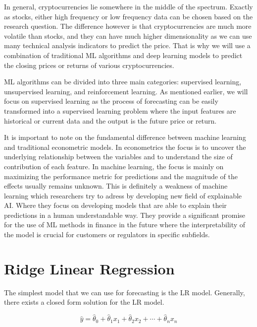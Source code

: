 In general, cryptocurrencies
lie somewhere in the middle of the spectrum. Exactly as stocks, either high frequency or low frequency
data can be chosen based on the research question. The difference however is that cryptocurrencies 
are much more volatile than stocks, and they can have much higher dimensionality as we can use 
many technical analysis indicators to predict the price. 
That is why we will use a combination of
traditional \ac{ML} algorithms and deep learning models to predict the 
closing prices or returns of
various cryptocurrencies.

\ac{ML} algorithms can be divided into three main categories: supervised learning, unsupervised learning, and reinforcement learning.
As mentioned earlier, we will focus on supervised learning as the process of forecasting
can be easily transformed into a supervised learning problem where the input features
are historical or current data and the output is the future price or return.


It is important to note on the fundamental difference between machine learning and
traditional econometric models. In econometrics the focus is to uncover the underlying
relationship between the variables and to understand the size of contribution of each
feature. In machine learning, the focus is mainly on maximizing the performance metric for predictions and 
the magnitude of the effects usually remains unknown. This is definitely a weakness of machine learning
which researchers try to adress by developing new field of explainable \ac{AI}. 
Where they focus on developing models that are able to explain their predictions in a human understandable way.
They provide a significant promise for the use of \ac{ML} methods in finance in the future
where the interpretability of the model is crucial for customers or regulators in specific subfields.





\section{Ridge Linear Regression}
The simplest model that we can use for forecasting is the \acl{LR} model.
Generally, there exists a closed form solution for the \ac{LR} model.

\begin{equation}
    \hat{y} = \hat{\theta}_0 + \hat{\theta}_1 x_1 + \hat{\theta}_2 x_2 + \cdots + \hat{\theta}_n x_n
\end{equation}

